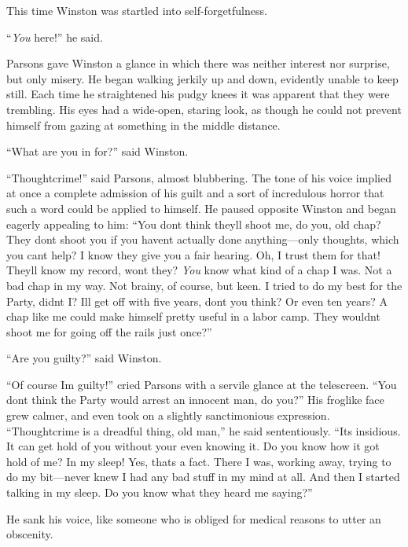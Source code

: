 This time Winston was startled into self-forgetfulness.

``\emph{You} here!'' he said.

Parsons gave Winston a glance in which there was neither interest nor
surprise, but only misery. He began walking jerkily up and down,
evidently unable to keep still. Each time he straightened his pudgy
knees it was apparent that they were trembling. His eyes had a
wide-open, staring look, as though he could not prevent himself from
gazing at something in the middle distance.

``What are you in for?'' said Winston.

``Thoughtcrime!'' said Parsons, almost blubbering. The tone of his voice
implied at once a complete admission of his guilt and a sort of
incredulous horror that such a word could be applied to himself. He
paused opposite Winston and began eagerly appealing to him: ``You
don\textquotesingle t think they\textquotesingle ll shoot me, do you,
old chap? They don\textquotesingle t shoot you if you
haven\textquotesingle t actually done anything---only thoughts, which
you can\textquotesingle t help? I know they give you a fair hearing. Oh,
I trust them for that! They\textquotesingle ll know my record,
won\textquotesingle t they? \emph{You} know what kind of a chap I was.
Not a bad chap in my way. Not brainy, of course, but keen. I tried to do
my best for the Party, didn\textquotesingle t I? I\textquotesingle ll
get off with five years, don\textquotesingle t you think? Or even ten
years? A chap like me could make himself pretty useful in a labor camp.
They wouldn\textquotesingle t shoot me for going off the rails just
once?''

``Are you guilty?'' said Winston.

``Of course I\textquotesingle m guilty!'' cried Parsons with a servile
glance at the telescreen. ``You don\textquotesingle t think the Party
would arrest an innocent man, do you?'' His froglike face grew calmer,
and even took on a slightly sanctimonious expression. ``Thoughtcrime is a
dreadful thing, old man,'' he said sententiously. ``It\textquotesingle s
insidious. It can get hold of you without your even knowing it. Do you
know how it got hold of me? In my sleep! Yes, that\textquotesingle s a
fact. There I was, working away, trying to do my bit---never knew I had
any bad stuff in my mind at all. And then I started talking in my sleep.
Do you know what they heard me saying?''

He sank his voice, like someone who is obliged for medical reasons to
utter an obscenity.

